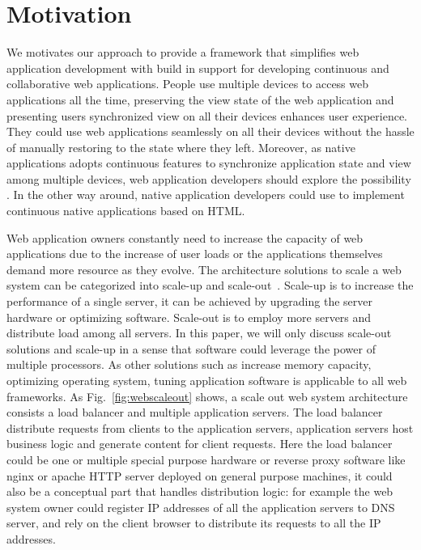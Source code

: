 \section{Motivation}
\label{sec:moti}

We motivates our approach to 
provide a framework that simplifies web application development
with build in support for developing continuous and collaborative web applications.
People use multiple devices to access web applications all the time, 
preserving the view state of the web application and presenting
users synchronized view on all their devices enhances user experience.
They could use web applications seamlessly on all their devices
without the hassle of manually restoring to the state where they left.
Moreover, as native applications adopts continuous features
to synchronize application state and view among multiple devices, 
web application developers should explore the possibility .%
In the other way around, native application developers could use \cb{} to 
implement continuous native applications based on HTML.

Web application owners constantly need to increase the capacity of web applications due
to the increase of user loads or the applications themselves demand more resource
as they evolve.
The architecture solutions to scale a web system can be categorized into 
scale-up and scale-out~\cite{cardellini2002state}.
Scale-up is to increase the performance of a single server,
it can be achieved by upgrading the server hardware or optimizing software.
Scale-out is to employ more servers and distribute load among all servers.
In this paper, we will only discuss scale-out solutions and scale-up in
a sense that software could leverage the power of multiple processors.
As other solutions such as increase memory capacity, optimizing operating system,
tuning application software is applicable to all web frameworks.
As Fig.~\ref{fig:webscaleout} shows, 
a scale out web system architecture consists a load balancer and multiple
application servers.
The load balancer distribute requests from clients to the application servers,
application servers host business logic and generate content for client requests.
Here the load balancer could be one or multiple special purpose hardware or reverse 
proxy software like nginx or apache HTTP server deployed on general purpose 
machines, it could also be a conceptual part that handles distribution logic:
for example the web system owner could register IP addresses of all the application
servers to DNS server, and rely on the client browser to distribute its requests to
all the IP addresses.

